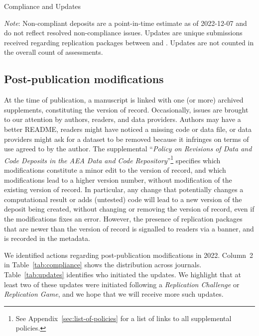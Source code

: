 \begin{table}[t]
    \centering
    \caption{Compliance and Updates}
    \label{tab:compliance}
    
    \begin{threeparttable}
    
    \begin{tablenotes}
    \footnotesize
    \item[] \textit{Note}: Non-compliant deposits are a point-in-time estimate as of 2022-12-07 and do not reflect resolved non-compliance issues. Updates are unique submissions received regarding replication packages  between \firstday{} and \lastday{}. Updates are not counted in the overall count of assessments. 
    \end{tablenotes}
    \end{threeparttable}

 \end{table}      
 


\subsection{Post-publication modifications}

At the time of publication, a manuscript is linked with one (or more) archived supplements, constituting the version of record. Occasionally, issues are brought to our attention by authors, readers, and data providers. Authors may have a better README, readers might have noticed a missing code or data file, or data providers might ask for a dataset to be removed because it infringes on terms of use agreed to by the author. The supplemental ``\textit{Policy on Revisions of Data and Code Deposits in the AEA Data and Code Repository}''\footnote{See Appendix~\ref{sec:list-of-policies} for a list of links to all supplemental policies.} specifies which modifications constitute a minor edit to the version of record, and which modifications lead to a higher version number, without modification of the existing version of record. In particular, any change that potentially changes a computational result or adds (untested) code will lead to a new version of the deposit being created, without changing or removing the version of record, even if the modifications fixes an error. However, the presence of replication packages that are newer than the version of record is signalled to readers via a banner, and is recorded in the metadata.

We identified \mcpubupdates{} actions regarding post-publication modifications in 2022. Column~2 in Table~\ref{tab:compliance} shows the distribution across journals. Table~\ref{tab:updates} identifies who initiated the updates.   We highlight that at least two of these updates were initiated following a \textit{Replication Challenge} or \textit{Replication Game}, and we hope that we will receive more such updates. 

